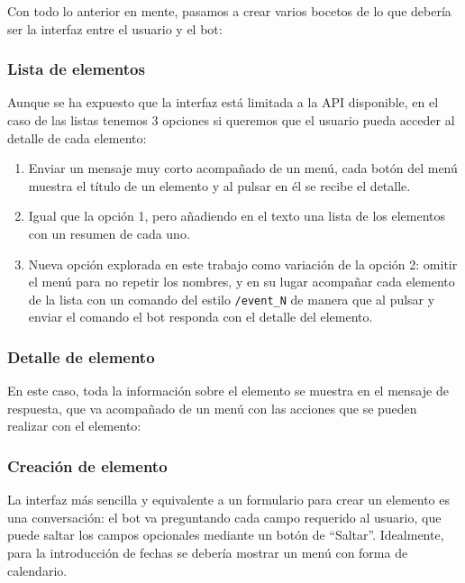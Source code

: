 Con todo lo anterior en mente, pasamos a crear varios bocetos de lo que debería ser la interfaz entre el usuario y el bot:

\subsubsection{Lista de elementos}

Aunque se ha expuesto que la interfaz está limitada a la API disponible, en el caso de las listas tenemos 3 opciones si queremos que el usuario pueda acceder al detalle de cada elemento:
\begin{enumerate}
    \item Enviar un mensaje muy corto acompañado de un menú, cada botón del menú muestra el título de un elemento y al pulsar en él se recibe el detalle.
    \item Igual que la opción 1, pero añadiendo en el texto una lista de los elementos con un resumen de cada uno.
    \item Nueva opción explorada en este trabajo como variación de la opción 2: omitir el menú para no repetir los nombres, y en su lugar acompañar cada elemento de la lista con un comando del estilo \texttt{/event\_N} de manera que al pulsar y enviar el comando el bot responda con el detalle del elemento.
\end{enumerate}


\subsubsection{Detalle de elemento}

En este caso, toda la información sobre el elemento se muestra en el mensaje de respuesta, que va acompañado de un menú con las acciones que se pueden realizar con el elemento:


\subsubsection{Creación de elemento}

La interfaz más sencilla y equivalente a un formulario para crear un elemento es una conversación: el bot va preguntando cada campo requerido al usuario, que puede saltar los campos opcionales mediante un botón de ``Saltar''.
Idealmente, para la introducción de fechas se debería mostrar un menú con forma de calendario.



